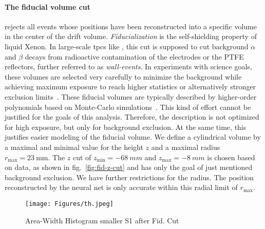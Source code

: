 \paragraph{The fiducial volume cut} rejects all events whose positions have been reconstructed into a specific volume in the center of the drift volume.
\emph{Fiducialization} is the self-shielding property of liquid Xenon.
In large-scale \glspl{tpc} like \nton, this cut is supposed to cut background $\alpha$ and $\beta$ decays from radioactive contamination of the electrodes or the PTFE reflectors, further referred to as \emph{wall-events}.
In experiments with science goals, these volumes are selected very carefully to minimize the background while achieving maximum exposure to reach higher statistics or alternatively stronger exclusion limits~\cite{?}.  %
These fiducial volumes are typically described by higher-order polynomials based on Monte-Carlo simulations~\cite{?}. %
This kind of effort cannot be justified for the goals of this analysis.
Therefore, the description is not optimized for high exposure, but only for background exclusion.
At the same time, this justifies easier modeling of the fiducial volume.
We define a cylindrical volume by a maximal and minimal value for the height $z$ and a maximal radius $r_\mathrm{max} = \SI{23}{\milli\m}$.
The $z$ cut of $ z_\mathrm{min} = \SI{-68}{mm} $ and $ z_\mathrm{max} = \SI{-8}{mm} $ is chosen based on data, as shown in fig.~\ref{fig:fid-z-cut} and has only the goal of just mentioned background exclusion. We have further restrictions for the radius.
The position reconstructed by the neural net is only accurate within this radial limit of $r_\mathrm{max}$\cite{ABism}.


\begin{figure}[H]
\centering
\texttt{[image: Figures/th.jpeg]}  %
\caption[Area-Width Histogram smaller S1 after Fid. Cut]{
    Area-Width Histogram smaller S1 after Fid. Cut
    }
\label{fig:other_s1_area_width}
\end{figure}


